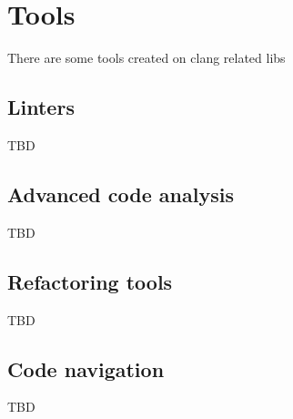 \chapter{Tools}
There are some tools created on clang related libs

\section{Linters}
TBD

\section{Advanced code analysis}
TBD

\section{Refactoring tools}
TBD

\section{Code navigation}
TBD

